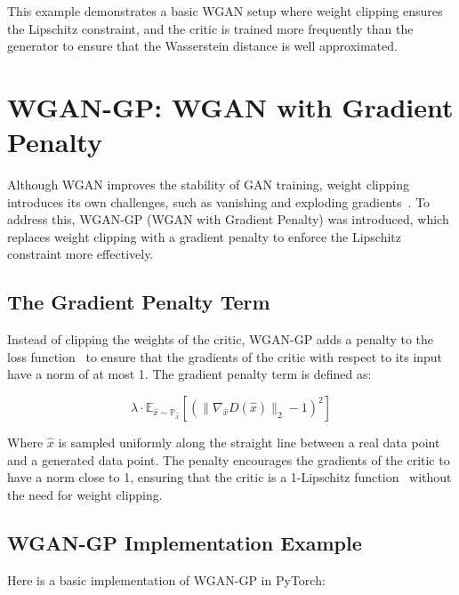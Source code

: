 This example demonstrates a basic WGAN setup where weight clipping ensures the Lipschitz constraint, and the critic is trained more frequently than the generator to ensure that the Wasserstein distance is well approximated.

\section{WGAN-GP: WGAN with Gradient Penalty}
Although WGAN improves the stability of GAN training, weight clipping introduces its own challenges, such as vanishing and exploding gradients~\cite{gulrajani2017improved}. To address this, WGAN-GP (WGAN with Gradient Penalty) was introduced, which replaces weight clipping with a gradient penalty to enforce the Lipschitz constraint more effectively.

\subsection{The Gradient Penalty Term}
Instead of clipping the weights of the critic, WGAN-GP adds a penalty to the loss function~\cite{gulrajani2017improved} to ensure that the gradients of the critic with respect to its input have a norm of at most 1. The gradient penalty term is defined as:

\[
\lambda \cdot \mathbb{E}_{\hat{x} \sim \mathbb{P}_{\hat{x}}} \left[ \left( \|\nabla_{\hat{x}} D(\hat{x}) \|_2 - 1 \right)^2 \right]
\]

Where \( \hat{x} \) is sampled uniformly along the straight line between a real data point and a generated data point. The penalty encourages the gradients of the critic to have a norm close to 1, ensuring that the critic is a 1-Lipschitz function~\cite{anil2019sorting} without the need for weight clipping.

\subsection{WGAN-GP Implementation Example}
Here is a basic implementation of WGAN-GP in PyTorch:

